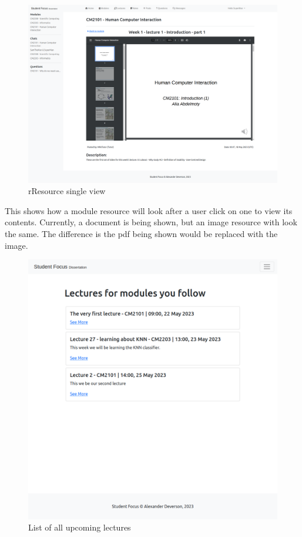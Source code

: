 \begin{figure}[H]
\centering
\includegraphics[scale=0.20]{images/application/35 - resource_single_view.png}
\caption{rResource single view}
\label{fig:figure2}
\end{figure}

This shows how a module resource will look after a user click on one to view its contents. Currently, a document is being shown, but an image resource with look the same. The difference is the pdf being shown would be replaced with the image. 

\begin{figure}[H]
\centering
\includegraphics[scale=0.35]{images/application/38 - lecture_list_more.png}
\caption{List of all upcoming lectures}
\label{fig:figure2}
\end{figure}

